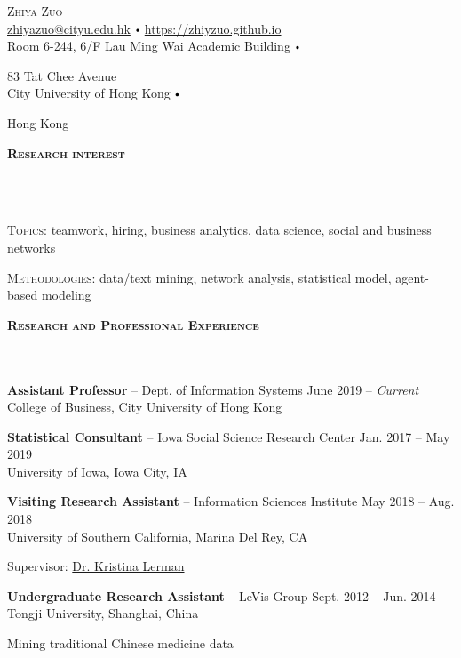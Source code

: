 \documentclass{article}
\newcommand{\contact}[3]{
\vspace*{5pt}
\begin{center}
{\LARGE \scshape {#1}}\\
\vspace{3pt}
#2 
\vspace{2pt}
#3
\end{center}
\vspace*{-8pt}
}
\newcommand{\header}[1]{{
\hspace*{-15pt}\vspace*{6pt} \textbf{\textsc{\large{#1}}}} \vspace*{-6pt} 
\lineunder
}
\newcommand{\lineunder}{
\vspace*{-8pt} \\ \hspace*{-15pt} 
\hrulefill \\
}
\newcommand{\employer}[4]{{
\vspace*{2pt}%
\textbf{#1} #2 \hfill #3\\ #4 \vspace*{2pt}}
}
\renewcommand{\labelitemi}{
$\vcenter{\hbox{\tiny$\bullet$}}$\hspace*{3pt}
}
\renewcommand{\labelitemii}{
$\vcenter{\hbox{\tiny$\bullet$}}$\hspace*{-3pt}
}
\newenvironment{bullet-list-major}{
\begin{list}{\labelitemii}{\setlength\leftmargin{3pt} 
\topsep 0pt \itemsep -2pt}}{\vspace*{4pt}\end{list}
}
\newenvironment{bullet-list-minor}{
\begin{list}{\labelitemii}{\setlength\leftmargin{15pt} 
\topsep 0pt \itemsep -2pt}}{\vspace*{4pt}\end{list}
}
\begin{document}
\small
\smallskip
\vspace*{-44pt}

\contact{Zhiya Zuo}
{\href{mailto:zhiyazuo@cityu.edu.hk}{zhiyazuo@cityu.edu.hk} \labelitemi \href{https://zhiyzuo.github.io}{https://zhiyzuo.github.io}\\}
{Room 6-244, 6/F Lau Ming Wai Academic Building \labelitemi
83 Tat Chee Avenue \\
City University of Hong Kong \labelitemi 
Hong Kong 
}

\thispagestyle{firstpage}

\vspace{15pt}
\header{Research interest}
\begin{bullet-list-major}
    \item \textsc{Topics}: teamwork, hiring, business analytics, data science, social and business networks
    \item \textsc{Methodologies}: data/text mining, network analysis, statistical model, agent-based modeling
\end{bullet-list-major}

\vspace*{4pt}
\header{Research and Professional Experience}
    \employer{Assistant Professor}{-- Dept. of Information Systems}{June 2019 -- \textit{Current}}{College of Business, City University of Hong Kong}
    \vspace*{4pt}
    
    \employer{Statistical Consultant}{-- Iowa Social Science Research Center}{Jan. 2017 -- May 2019}{University of Iowa, Iowa City, IA}
    \vspace*{4pt}

    \employer{Visiting Research Assistant}{-- Information Sciences Institute}{May 2018 -- Aug. 2018}{University of Southern California, Marina Del Rey, CA}
	\begin{bullet-list-minor}
        \item Supervisor: \href{www.isi.edu/~lerman/}{Dr. Kristina Lerman}
    \end{bullet-list-minor}
    
    \employer{Undergraduate Research Assistant}{-- LeVis Group}{Sept. 2012 -- Jun. 2014}{Tongji University, Shanghai, China}
	\begin{bullet-list-minor}
        \item Mining traditional Chinese medicine data
    \end{bullet-list-minor}
    
\end{document}
